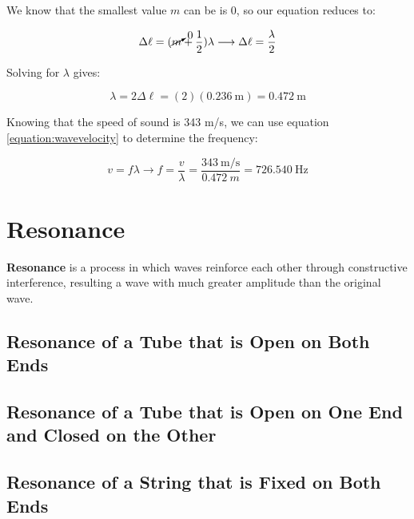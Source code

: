 \begin{mdframed}[backgroundcolor=blue!10!white]
		We know that the smallest value $m$ can be is 0, so our equation reduces to:
				
		\begin{equation*}
		\Delta \ell = (\cancelto{0}{m}+\frac{1}{2}) \lambda \longrightarrow \Delta \ell = \frac{\lambda}{2}
		\end{equation*}
		
		


		Solving for $\lambda$ gives:
		
		
		\begin{equation*}
		\lambda = 2 \Delta \ell = (2)(\SI{0.236}{\m}) = \SI{0.472}{\m}
		\end{equation*}
		
	
		Knowing that the speed of sound is 343 m/s, we can use equation \ref{equation:wavevelocity} to determine the frequency:
		
		\begin{equation*}
		v = f \lambda \longrightarrow f = \frac{v}{\lambda} = \frac{\SI[per-mode = symbol]{343}{\m\per\s}}{\SI{0.472}{m}} = \boxed{\SI{726.540}{\Hz}} 
		\end{equation*}
		

		 
	
		
	\end{mdframed}
	
	
	\section{Resonance}
	\textbf{Resonance} is a process in which waves reinforce each other through constructive interference, resulting a wave with much greater amplitude than the original wave.  
	
	\subsection{Resonance of a Tube that is Open on Both Ends}
	\subsection{Resonance of a Tube that is Open on One End and Closed on the Other}
	\subsection{Resonance of a String that is Fixed on Both Ends}
	
	
	
	
	

	
	
	

	

	


